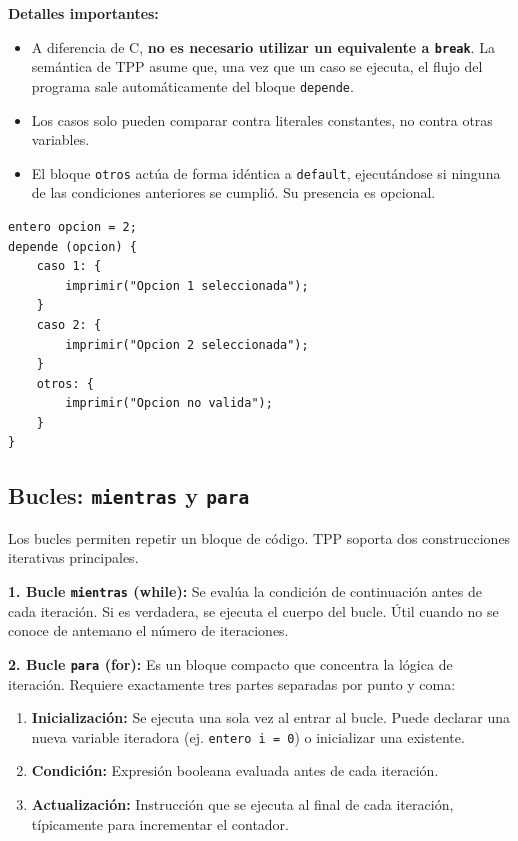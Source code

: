 \textbf{Detalles importantes:}
\begin{itemize}
    \item A diferencia de C, \textbf{no es necesario utilizar un equivalente a \texttt{break}}. La semántica de TPP asume que, una vez que un caso se ejecuta, el flujo del programa sale automáticamente del bloque \texttt{depende}.
    \item Los casos solo pueden comparar contra literales constantes, no contra otras variables.
    \item El bloque \texttt{otros} actúa de forma idéntica a \texttt{default}, ejecutándose si ninguna de las condiciones anteriores se cumplió. Su presencia es opcional.
\end{itemize}

\begin{lstlisting}[style=tppstyle, caption={Uso de depende y caso}]
entero opcion = 2;
depende (opcion) {
    caso 1: {
        imprimir("Opcion 1 seleccionada");
    }
    caso 2: {
        imprimir("Opcion 2 seleccionada");
    }
    otros: {
        imprimir("Opcion no valida");
    }
}
\end{lstlisting}

\subsection{Bucles: \texttt{mientras} y \texttt{para}}

Los bucles permiten repetir un bloque de código. TPP soporta dos construcciones iterativas principales.

\textbf{1. Bucle \texttt{mientras} (while):} 
Se evalúa la condición de continuación antes de cada iteración. Si es verdadera, se ejecuta el cuerpo del bucle. Útil cuando no se conoce de antemano el número de iteraciones.

\textbf{2. Bucle \texttt{para} (for):} 
Es un bloque compacto que concentra la lógica de iteración. Requiere exactamente tres partes separadas por punto y coma:
\begin{enumerate}
    \item \textbf{Inicialización:} Se ejecuta una sola vez al entrar al bucle. Puede declarar una nueva variable iteradora (ej. \texttt{entero i = 0}) o inicializar una existente.
    \item \textbf{Condición:} Expresión booleana evaluada antes de cada iteración.
    \item \textbf{Actualización:} Instrucción que se ejecuta al final de cada iteración, típicamente para incrementar el contador.
\end{enumerate}

